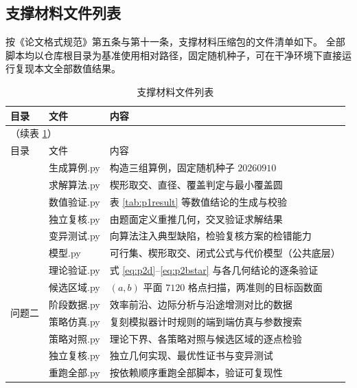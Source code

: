 \documentclass[withoutpreface, bwprint]{cumcmthesis}
\begin{document}
\begin{appendices}

\section{支撑材料文件列表}
\label{app:files}

按《论文格式规范》第五条与第十一条，支撑材料压缩包的文件清单如下。
全部脚本均以仓库根目录为基准使用相对路径，固定随机种子，可在干净环境下直接运行复现本文全部数值结果。

\begin{longtable}{llp{6.6cm}}
  \caption{支撑材料文件列表}\label{tab:files}\\
    \toprule
    目录 & 文件 & 内容 \\
    \midrule
  \endfirsthead
    \multicolumn{3}{l}{\small（续表 \ref{tab:files}）}\\
    \toprule
    目录 & 文件 & 内容 \\
    \midrule
  \endhead
    \bottomrule
  \endlastfoot
    \multirow{5}{*}{问题一}
      & 生成算例.py & 构造三组算例，固定随机种子 $20260910$ \\
      & 求解算法.py & 楔形取交、直径、覆盖判定与最小覆盖圆 \\
      & 数值验证.py & 表 \ref{tab:p1result} 等数值结论的生成与校验 \\
      & 独立复核.py & 由题面定义重推几何，交叉验证求解结果 \\
      & 变异测试.py & 向算法注入典型缺陷，检验复核方案的检错能力 \\
    \midrule
    \multirow{8}{*}{问题二}
      & 模型.py & 可行集、楔形取交、闭式公式与代价模型（公共底层） \\
      & 理论验证.py & 式 \eqref{eq:p2d}--\eqref{eq:p2bstar} 与各几何结论的逐条验证 \\
      & 候选区域.py & $(a,b)$ 平面 $7120$ 格点扫描，两准则的目标函数面 \\
      & 阶段数据.py & 效率前沿、边际分析与沿途增测对比的数据 \\
      & 策略仿真.py & 复刻模拟器计时规则的端到端仿真与参数搜索 \\
      & 策略对照.py & 理论下界、各策略对照与候选区域的逐点检验 \\
      & 独立复核.py & 独立几何实现、最优性证书与变异测试 \\
      & 重跑全部.py & 按依赖顺序重跑全部脚本，验证可复现性 \\
    \midrule

\end{longtable}
\end{appendices}
\end{document}
